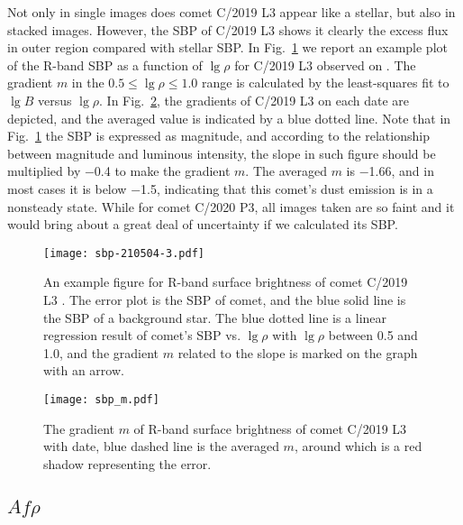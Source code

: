 Not only in single images does comet C/2019 L3 appear like a stellar, but also in stacked images. However, the SBP of C/2019 L3 shows it clearly the excess flux in outer region compared with stellar SBP. In Fig.~\ref{fig:sbp} we report an example plot of the R-band SBP as a function of $\lg{\rho}$ for C/2019 L3 observed on . The gradient $m$ in the $0.5 \leqslant \lg{\rho} \leqslant 1.0$ range is calculated by the least-squares fit to $\lg{B}$ versus $\lg{\rho}$. 
In Fig.~\ref{fig:sbp_m}, the gradients of C/2019 L3 on each date are depicted, and the averaged value is indicated by a blue dotted line. 
Note that in Fig.~\ref{fig:sbp} the SBP is expressed as magnitude, and according to the relationship between magnitude and luminous intensity, the slope in such figure should be multiplied by \num{-0.4} to make the gradient $m$. The averaged $m$ is \num{-1.66}, and in most cases it is below \num{-1.5}, indicating that this comet's dust emission is in a nonsteady state. While for comet C/2020 P3, all images taken are so faint and it would bring about a great deal of uncertainty if we calculated its SBP. 

\begin{figure}
    \centering
    \texttt{[image: sbp-210504-3.pdf]}
    \caption{An example figure for R-band surface brightness of comet C/2019 L3 . The error plot is the SBP of comet, and the blue solid line is the SBP of a background star. The blue dotted line is a linear regression result of comet's SBP vs. $\lg{\rho}$ with $\lg{\rho}$ between 0.5 and 1.0, and the gradient $m$ related to the slope is marked on the graph with an arrow. }
    \label{fig:sbp}
\end{figure}

\begin{figure}
    \centering
    \texttt{[image: sbp\_m.pdf]}
    \caption{The gradient $m$ of R-band surface brightness of comet C/2019 L3  with date, blue dashed line is the averaged $m$, around which is a red shadow representing the error. }
    \label{fig:sbp_m}
\end{figure}


\subsection{$Af\rho$}

